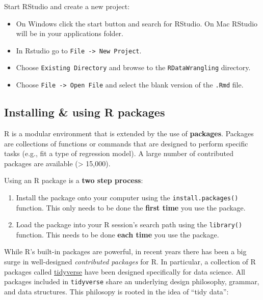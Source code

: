 \documentclass[]{book}
\providecommand{\tightlist}{%
  \setlength{\itemsep}{0pt}\setlength{\parskip}{0pt}}
\begin{document}
Start RStudio and create a new project:

\begin{itemize}
\tightlist
\item
  On Windows click the start button and search for RStudio. On Mac
  RStudio will be in your applications folder.
\item
  In Rstudio go to \texttt{File\ -\textgreater{}\ New\ Project}.
\item
  Choose \texttt{Existing\ Directory} and browse to the \texttt{RDataWrangling} directory.
\item
  Choose \texttt{File\ -\textgreater{}\ Open\ File} and select the blank version of the \texttt{.Rmd} file.
\end{itemize}

\hypertarget{installing-using-r-packages-3}{%
\subsection{Installing \& using R packages}\label{installing-using-r-packages-3}}

R is a modular environment that is extended by the use of \textbf{packages}.
Packages are collections of functions or commands that are designed to
perform specific tasks (e.g., fit a type of regression model). A large
number of contributed packages are available (\textgreater{} 15,000).

Using an R package is a \textbf{two step process}:

\begin{enumerate}
\def\labelenumi{\arabic{enumi}.}
\item
  Install the package onto your computer using the
  \texttt{install.packages()} function. This only needs to
  be done the \textbf{first time} you use the package.
\item
  Load the package into your R session's search path
  using the \texttt{library()} function. This needs to be done
  \textbf{each time} you use the package.
\end{enumerate}

While R's built-in packages are powerful, in recent years there has
been a big surge in well-designed \emph{contributed packages} for R.
In particular, a collection of R packages called
\href{https://www.tidyverse.org/}{tidyverse} have been
designed specifically for data science. All packages included in
\texttt{tidyverse} share an underlying design philosophy, grammar, and
data structures. This philosopy is rooted in the idea of ``tidy data'':
\end{document}
